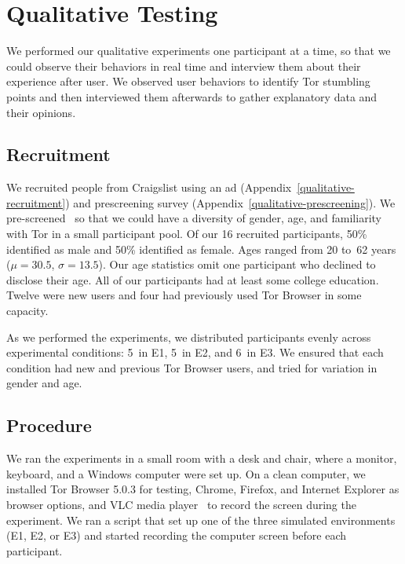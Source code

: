 \documentclass[USenglish,oneside,twocolumn]{article}
\begin{document}
\section{Qualitative Testing}
\label{sec:qualitative}
We performed our qualitative experiments one participant at a time, so that we could observe their behaviors in real time and interview them about their experience after user. We observed user behaviors to identify Tor stumbling points and then interviewed them afterwards to gather explanatory data and their opinions. 

\subsection{Recruitment}
We recruited people from Craigslist using an ad (Appendix~\ref{qualitative-recruitment}) and prescreening survey (Appendix~\ref{qualitative-prescreening}). We pre-screened~\cite{screening} so that we could have a diversity of gender, age, and familiarity with Tor in a small participant pool. Of our 16 recruited participants, 50\% identified as male and 50\% identified as female. Ages ranged from 20 to~62 years ($\mu = 30.5$, $\sigma = 13.5$). Our age statistics omit one participant who declined to disclose their age. All of our participants had at least some college education. Twelve were new users and four had previously used Tor Browser in some capacity.  



As we performed the experiments, we distributed participants evenly across experimental conditions:  5~in E1, 5~in E2, and 6~in E3. We ensured that each condition had new and previous Tor Browser users, and tried for variation in gender and age.

\subsection{Procedure} 
We ran the experiments in a small room with a desk and chair, where a monitor, keyboard, and a Windows computer were set up. On a clean computer, we installed Tor Browser 5.0.3 for testing, Chrome, Firefox, and Internet Explorer as browser options, and VLC media player~\cite{vlc} to record the screen during the experiment. We ran a script that set up one of the three simulated environments (E1, E2, or E3) and started recording the computer screen before each participant.
\end{document}
